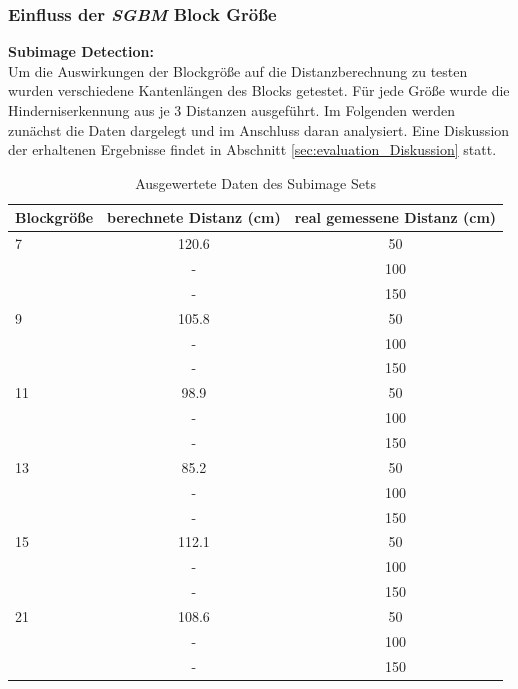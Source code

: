 \noindent
\subsubsection{Einfluss der \emph{SGBM} Block Größe}
\label{subsec:block_size_change}

\textbf{Subimage Detection:}\\
\noindent
Um die Auswirkungen der Blockgröße auf die Distanzberechnung zu testen wurden verschiedene Kantenlängen des Blocks getestet. Für jede Größe wurde die Hinderniserkennung aus je 3 Distanzen ausgeführt. Im Folgenden werden zunächst die Daten dargelegt und im Anschluss daran analysiert. Eine Diskussion der erhaltenen Ergebnisse findet in Abschnitt \ref{sec:evaluation_Diskussion} statt.\\

	
\begin{table}[h]
\centering
\begin{tabular}{|l||c|c|}
\hline
Blockgröße & berechnete Distanz (cm)& real gemessene Distanz (cm)\\
\hline\hline
7          & 120.6          		& 50                     \\
           &  -                 & 100                    \\
           &  -                 & 150                    \\
\hline
9          & 105.8          		& 50                     \\
           &  -                 & 100                    \\
           &  -                 & 150                    \\
\hline
11         & 98.9           		& 50                     \\
           &  -                 & 100                    \\
           &  -                 & 150                    \\
\hline
13         & 85.2          		& 50                     \\
           &  -                 & 100                    \\
           &  -                 & 150                    \\
\hline
15         & 112.1		        & 50                     \\
           &  -                 & 100                    \\
           &  -                 & 150                    \\
\hline
21         & 108.6         		& 50                     \\
           &  -                 & 100                    \\
           &  -                 & 150                    \\
\hline
\end{tabular}
\caption{Ausgewertete Daten des Subimage Sets}
\label{tbl:distance_subimage}
\end{table}	

